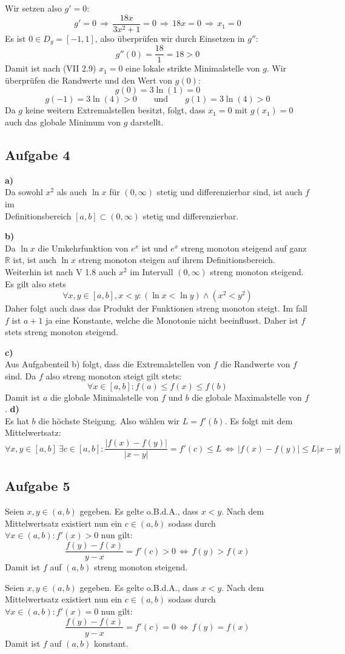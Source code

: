 \documentclass[a4paper,graphics,11pt]{article}
\newcommand{\aufgabe}[1]{\subsection*{Aufgabe #1}}
\begin{document}
Wir setzen also $g' = 0$:
$$
    g' = 0 \,\Longrightarrow\, \frac{18x}{3x^2+1} = 0
    \,\Longrightarrow\, 18x = 0 \,\Longrightarrow\, x_1 = 0
$$
Es ist $0 \in D_g = [-1, 1]$, also überprüfen wir durch Einsetzen in $g''$:
$$
    g''(0) = \frac{18}{1} = 18 > 0
$$
Damit ist nach (VII 2.9) $x_1=0$ eine lokale strikte Minimalstelle von $g$.
Wir überprüfen die Randwerte und den Wert von $g(0)$:
$$
    g(0) = 3\ln(1) = 0
$$$$
    g(-1) = 3\ln(4) > 0 \qquad\text{und}\qquad g(1) = 3\ln(4) >0
$$
Da $g$ keine weitern Extremalstellen besitzt, folgt, dass $x_1=0$ mit $g(x_1) = 0$ auch das
globale Minimum von $g$ darstellt.

\aufgabe{4}
\textbf{a)}\\
Da sowohl $x^2$ als auch $\ln x$ für $(0, \infty)$ stetig und differenzierbar sind, ist auch $f$ im\\
Definitionsbereich $[a,b] \subset (0, \infty)$ stetig und differenzierbar.

\textbf{b)}\\
Da $\ln x$ die Umkehrfunktion von $e^x$ ist und $e^x$ streng monoton steigend auf ganz $\mathbb{R}$ ist,
ist auch $\ln x$ streng monoton steigen auf ihrem Definitionsbereich. Weiterhin ist nach V 1.8 auch
$x^2$ im Intervall $(0, \infty)$ streng monoton steigend.
Es gilt also stets
$$
    \forall x,y \in [a,b], x<y \colon (\ln x < \ln y) \land (x^2 < y^2)
$$
Daher folgt auch dass das Produkt der Funktionen streng monoton steigt. Im fall $f$ ist $a+1$ ja eine Konstante,
welche die Monotonie nicht beeinflusst. Daher ist $f$ stets streng monoton steigend.

\textbf{c)}\\
Aus Aufgabenteil b) folgt, dass die Extremalstellen von $f$ die Randwerte von $f$ sind. Da $f$ also streng monoton
steigt gilt stets:
$$
    \forall x \in [a,b] \colon f(a) \leq f(x) \leq f(b)
$$
Damit ist $a$ die globale Minimalstelle von $f$ und $b$ die globale Maximalstelle von $f$.
\newpage
\textbf{d)}\\

Es hat $b$ die höchste Steigung. Also wählen wir $L = f'(b)$. Es folgt mit dem Mittelwertsatz:
$$
    \forall x,y \in [a,b]\ \exists c \in [a,b] \colon \frac{|f(x)-f(y)|}{|x-y|} = f'(c) \leq L
    \,\Longleftrightarrow\, |f(x)-f(y)| \leq L|x-y|
$$

\aufgabe{5}

Seien $x,y \in (a,b)$ gegeben. Es gelte o.B.d.A., dass $x<y$. Nach dem Mittelwertsatz existiert nun ein
$c \in (a,b)$ sodass durch $\forall x \in (a,b) \colon f'(x) > 0$ nun gilt:
$$
    \frac{f(y) - f(x)}{y-x} = f'(c) > 0 \,\Longleftrightarrow\, f(y) > f(x)
$$
Damit ist $f$ auf $(a,b)$ streng monoton steigend.

Seien $x,y \in (a,b)$ gegeben. Es gelte o.B.d.A., dass $x < y$. Nach dem Mittelwertsatz existiert nun ein
$c \in (a,b)$ sodass durch $\forall x \in (a,b) \colon f'(x) = 0$ nun gilt:
$$
    \frac{f(y) - f(x)}{y-x} = f'(c) = 0 \,\Longleftrightarrow\, f(y) = f(x)
$$
Damit ist $f$ auf $(a,b)$ konstant.
\end{document}
